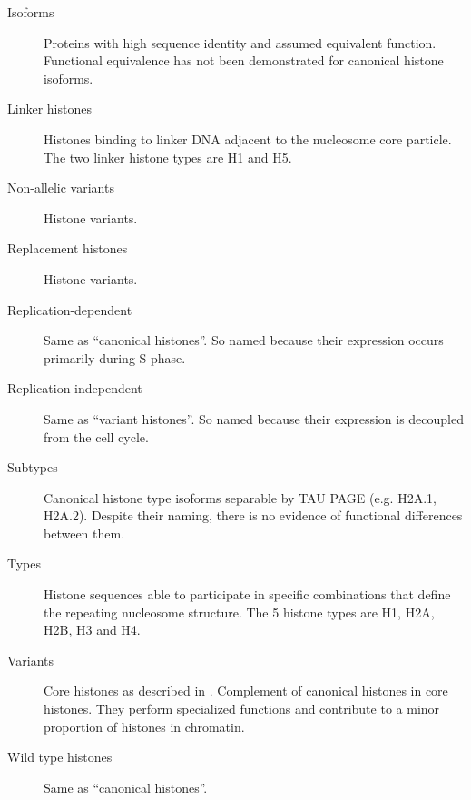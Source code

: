 {\begin{shaded}
\begin{description}
        \item[Isoforms] \hfill \newline
        Proteins with high sequence identity and assumed equivalent function.
        Functional equivalence has not been demonstrated for canonical histone isoforms.

        \item[Linker histones] \hfill \newline
        Histones binding to linker DNA adjacent to the nucleosome core particle.
        The two linker histone types are H1 and H5.

        \item[Non-allelic variants] \hfill \newline
        Histone variants.

        \item[Replacement histones] \hfill \newline
        Histone variants.

        \item[Replication-dependent] \hfill \newline
        Same as ``canonical histones''.  So named because their expression
        occurs primarily during S phase.

        \item[Replication-independent] \hfill \newline
        Same as ``variant histones''.  So named because their expression is
        decoupled from the cell cycle.

        \item[Subtypes] \hfill \newline
        Canonical histone type isoforms separable by TAU PAGE
        (e.g. H2A.1, H2A.2).  Despite their naming, there is no evidence of
        functional differences between them.

        \item[Types] \hfill \newline
        Histone sequences able to participate in specific combinations
        that define the repeating nucleosome structure.
        The 5 histone types are H1, H2A, H2B, H3 and H4.

        \item[Variants] \hfill \newline
        Core histones as described in .
        Complement of canonical histones in core histones.  They perform
        specialized functions and contribute to a minor proportion of
        histones in chromatin.

        \item[Wild type histones] \hfill \newline
        Same as ``canonical histones''.
      \end{description}
    \end{shaded}
  }

